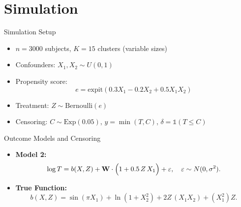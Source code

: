 \documentclass{beamer}
\begin{document}
\section{Simulation}

\begin{frame}{Simulation Setup}
  \begin{itemize}
    \vfill \item \(n = 3000\) subjects, \(K = 15\) clusters (variable sizes)
    \vfill \item Confounders: \(X_1, X_2 \sim U(0,1)\)
    \vfill \item Propensity score:
    \[
    e = \text{expit}(0.3X_1 - 0.2X_2 + 0.5X_1X_2)
    \]
    \vfill \item Treatment: \(Z \sim \text{Bernoulli}(e)\)
    \vfill \item Censoring: \(C \sim \text{Exp}(0.05)\), \(y = \min(T, C)\), \(\delta = \mathds{1}(T \le C)\)
  \end{itemize}
  \end{frame}
\begin{frame}{Outcome Models and Censoring}
  \begin{itemize}
    \vfill \itRem \textbf{ Model 1:}
      \[
      \log T = b(X,Z) + \mathbf{W} + \varepsilon,\quad \varepsilon\sim N(0,\sigma^2).
      \]
    \vspace{6pt}
    \vfill \item \textbf{ Model 2:}
      \[
      \log T = b(X,Z) + \mathbf{W}\cdot\Bigl(1+0.5\,Z\,X_1\Bigr) + \varepsilon,\quad \varepsilon\sim N(0,\sigma^2).
      \]
    \vspace{6pt}
    \vfill \item \textbf{True Function:}
      \[
      b(X,Z) = \sin(\pi X_1) + \ln(1+X_2^2) + 2Z\,(X_1X_2) + (X_1^2)Z.
      \]
  \end{itemize}
\end{frame}
\end{document}

